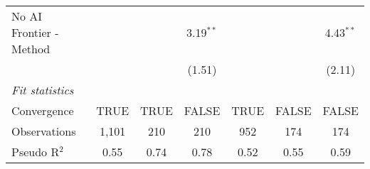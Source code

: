 \begin{tabular}{lcccccc}
   No AI Frontier - Method &              &               & 3.19$^{**}$  &              &              & 4.43$^{**}$\\   
                           &              &               & (1.51)       &              &              & (2.11)\\   
   \midrule
   \emph{Fit statistics}\\
   Convergence             &TRUE          & TRUE          & FALSE        & TRUE         & FALSE        & FALSE\\  
   Observations            & 1,101        & 210           & 210          & 952          & 174          & 174\\  
   Pseudo R$^2$            & 0.55         & 0.74          & 0.78         & 0.52         & 0.55         & 0.59\\  
   

\end{tabular}
